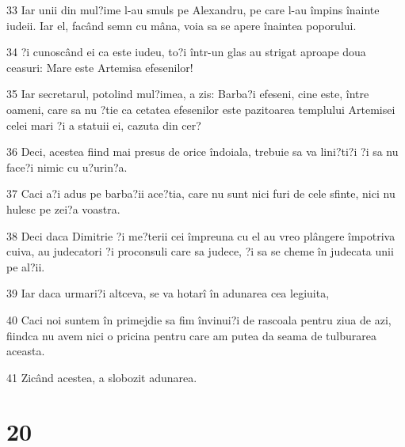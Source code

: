 \par 33 Iar unii din mul?ime l-au smuls pe Alexandru, pe care l-au împins înainte iudeii. Iar el, facând semn cu mâna, voia sa se apere înaintea poporului.
\par 34 ?i cunoscând ei ca este iudeu, to?i într-un glas au strigat aproape doua ceasuri: Mare este Artemisa efesenilor!
\par 35 Iar secretarul, potolind mul?imea, a zis: Barba?i efeseni, cine este, între oameni, care sa nu ?tie ca cetatea efesenilor este pazitoarea templului Artemisei celei mari ?i a statuii ei, cazuta din cer?
\par 36 Deci, acestea fiind mai presus de orice îndoiala, trebuie sa va lini?ti?i ?i sa nu face?i nimic cu u?urin?a.
\par 37 Caci a?i adus pe barba?ii ace?tia, care nu sunt nici furi de cele sfinte, nici nu hulesc pe zei?a voastra.
\par 38 Deci daca Dimitrie ?i me?terii cei împreuna cu el au vreo plângere împotriva cuiva, au judecatori ?i proconsuli care sa judece, ?i sa se cheme în judecata unii pe al?ii.
\par 39 Iar daca urmari?i altceva, se va hotarî în adunarea cea legiuita,
\par 40 Caci noi suntem în primejdie sa fim învinui?i de rascoala pentru ziua de azi, fiindca nu avem nici o pricina pentru care am putea da seama de tulburarea aceasta.
\par 41 Zicând acestea, a slobozit adunarea.

\chapter{20}

